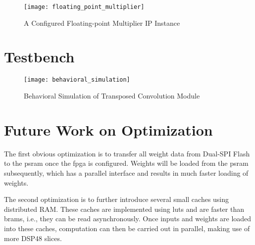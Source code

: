 \begin{figure}[h]
  \centering
  \texttt{[image: floating\_point\_multiplier]}
  \caption{A Configured Floating-point Multiplier IP Instance}
  \label{fig:floating_point_multiplier}
\end{figure}

\section{Testbench}

\begin{figure}[h]
  \centering
  \texttt{[image: behavioral\_simulation]}
  \caption{Behavioral Simulation of Transposed Convolution Module}
  \label{fig:behavioral_simulation}
\end{figure}

\section{Future Work on Optimization}

The first obvious optimization is to transfer all weight data from Dual-SPI Flash to the \gls{psram} once
the \gls{fpga} is configured. Weights will be loaded from the \gls{psram} subsequently, which has a parallel
interface and results in much faster loading of weights.

The second optimization is to further introduce several small caches using distributed RAM. These caches
are implemented using \glspl{lut} and are faster than \glspl{bram}, i.e., they can be read asynchronously.
Once inputs and weights are loaded into these caches, computation can then be carried out in parallel,
making use of more DSP48 slices.

\clearpage %
